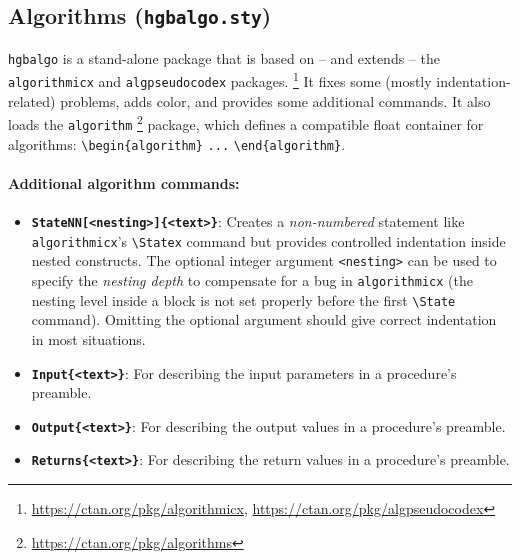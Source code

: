 \documentclass[language=english]{hgbarticle}
\begin{document}
\subsection{Algorithms (\texttt{hgbalgo.sty})}

\texttt{hgbalgo} is a stand-alone package that is based on -- and extends --
the \texttt{algorithmicx} and \texttt{algpseudocodex} packages.%
\footnote{\url{https://ctan.org/pkg/algorithmicx},
    \url{https://ctan.org/pkg/algpseudocodex}}
It fixes some (mostly indentation-related) problems, adds color, and provides
some additional commands. It also loads the \texttt{algorithm}%
\footnote{\url{https://ctan.org/pkg/algorithms}}
package, which defines a compatible float container for algorithms:
\verb!\begin{algorithm}! \verb!...! \verb!\end{algorithm}!.

\paragraph{Additional algorithm commands:}
\begin{itemize}
    \item
    \textbf{\texttt{{\bs}StateNN[<nesting>]\{<text>\}}}:
    Creates a \emph{non-numbered} statement like \texttt{algo\-rith\-micx}'s
    \verb!\Statex! command but provides controlled indentation inside nested
    constructs. The optional integer argument \verb!<nesting>! can be used to
    specify the \emph{nesting depth} to compensate for a bug in
    \texttt{algorithmicx} (the nesting level inside a block is not set
    properly before the first \verb!\State! command). Omitting the optional
    argument should give correct indentation in most situations.
    \item
    \textbf{\texttt{{\bs}Input\{<text>\}}}:
    For describing the input parameters in a procedure's preamble.
    \item
    \textbf{\texttt{{\bs}Output\{<text>\}}}:
    For describing the output values in a procedure's preamble.
    \item
    \textbf{\texttt{{\bs}Returns\{<text>\}}}:
    For describing the return values in a procedure's preamble.
\end{itemize}
\end{document}
